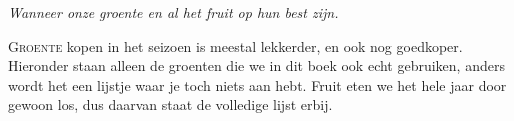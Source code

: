 \cleartoevenpage
{\itshape\small\color{inkfaint}Wanneer onze groente en al het fruit op hun best zijn.\par}\vspace{1.2em}

\lettrine{G}{roente} kopen in het seizoen is meestal lekkerder, en ook nog
goedkoper. Hieronder staan alleen de groenten die we in dit boek ook echt
gebruiken, anders wordt het een lijstje waar je toch niets aan hebt. Fruit
eten we het hele jaar door gewoon los, dus daarvan staat de volledige lijst
erbij.

\newcommand{\seizoenmaanden}{%
  \begin{tikzpicture}[x=0.75cm]
    \useasboundingbox (0,-0.3) rectangle (12,0.3);
    \foreach \m [count=\i from 0] in {J,F,M,A,M,J,J,A,S,O,N,D} {
      \node[font=\tiny\itshape, text=inkfaint] at (\i+0.5,0) {\m};
    }
  \end{tikzpicture}}
\newcommand{\seizoenbalk}[1]{%
  \begin{tikzpicture}[x=0.75cm, y=0.045cm]
    \draw[line width=0.3pt, color=inkfaint] (0,0) -- (12,0);
    \foreach \i in {0,...,12} {
      \draw[line width=0.3pt, color=inkfaint] (\i,-1) -- (\i,1);
    }
    \foreach \start/\eind in {#1} {
      \draw[line width=3.4pt, color=terracotta, line cap=round]
        (\start-1,0) -- (\eind,0);
    }
  \end{tikzpicture}}
\newcommand{\seizoenrij}[2]{#1 & \seizoenbalk{#2} \\}
\newcommand{\seizoenkop}{%
  & \seizoenmaanden \\
  \multicolumn{2}{@{}l@{}}{\textcolor{terracotta}{\rule{\linewidth}{0.4pt}}} \\[0.1em]}

